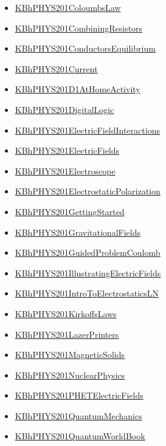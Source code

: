 \documentclass[11pt]{article}
\begin{document}
\begin{itemize}
\begin{itemize}
\item \href{phys201/KBhPHYS201ColoumbsLaw.org}{KBhPHYS201ColoumbsLaw}
\item \href{phys201/KBhPHYS201CombiningResistors.org}{KBhPHYS201CombiningResistors}
\item \href{phys201/KBhPHYS201ConductorsEquilibrium.org}{KBhPHYS201ConductorsEquilibrium}
\item \href{phys201/KBhPHYS201Current.org}{KBhPHYS201Current}
\item \href{phys201/KBhPHYS201D1AtHomeActivity.org}{KBhPHYS201D1AtHomeActivity}
\item \href{phys201/KBhPHYS201DigitalLogic.org}{KBhPHYS201DigitalLogic}
\item \href{phys201/KBhPHYS201ElectricFieldInteractions.org}{KBhPHYS201ElectricFieldInteractions}
\item \href{phys201/KBhPHYS201ElectricFields.org}{KBhPHYS201ElectricFields}
\item \href{phys201/KBhPHYS201Electroscope.org}{KBhPHYS201Electroscope}
\item \href{phys201/KBhPHYS201ElectrostaticPolarization.org}{KBhPHYS201ElectrostaticPolarization}
\item \href{phys201/KBhPHYS201GettingStarted.org}{KBhPHYS201GettingStarted}
\item \href{phys201/KBhPHYS201GravitationalFields.org}{KBhPHYS201GravitationalFields}
\item \href{phys201/KBhPHYS201GuidedProblemCoulomb.org}{KBhPHYS201GuidedProblemCoulomb}
\item \href{phys201/KBhPHYS201IllustratingElectricFields.org}{KBhPHYS201IllustratingElectricFields}
\item \href{phys201/KBhPHYS201IntroToElectrostaticsLN.org}{KBhPHYS201IntroToElectrostaticsLN}
\item \href{phys201/KBhPHYS201KirkoffsLaws.org}{KBhPHYS201KirkoffsLaws}
\item \href{phys201/KBhPHYS201LazerPrinters.org}{KBhPHYS201LazerPrinters}
\item \href{phys201/KBhPHYS201MagneticSolids.org}{KBhPHYS201MagneticSolids}
\item \href{phys201/KBhPHYS201NuclearPhysics.org}{KBhPHYS201NuclearPhysics}
\item \href{phys201/KBhPHYS201PHETElectricFields.org}{KBhPHYS201PHETElectricFields}
\item \href{phys201/KBhPHYS201QuantumMechanics.org}{KBhPHYS201QuantumMechanics}
\item \href{phys201/KBhPHYS201QuantumWorldBook.org}{KBhPHYS201QuantumWorldBook}

\end{itemize}
\end{itemize}
\end{document}
